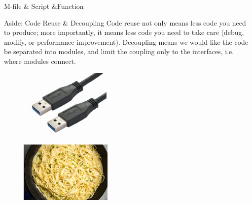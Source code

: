 \begin{frame}{M-file \& Script \&Function}
\begin{block}{Aside: Code Reuse \& Decoupling\footnotemark}
Code reuse not only means less code you need to produce; more importantly, it means less code you need to take care (debug, modify, or performance improvement). Decoupling means we would like the code be separated into modules, and limit the coupling only to the interfaces, i.e. where modules connect.
\end{block}
\begin{minipage}{0.48\textwidth}
	\begin{figure}
		\centering
		\includegraphics[width=0.4\textwidth]{pic/low-coupling.jpg}
	\end{figure}
\end{minipage}
\begin{minipage}{0.48\textwidth}
	\begin{figure}
		\centering
		\includegraphics[width=0.4\textwidth]{pic/high-coupling.jpg}
	\end{figure}
\end{minipage}
\end{frame}


